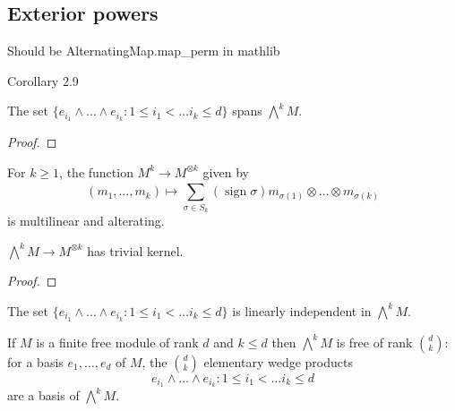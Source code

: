 
\subsection{Exterior powers}

\begin{theorem}
    \label{thm:exterior_power_univ_property}
\end{theorem}

\begin{lemma}
    \label{lem:alternating_multilinear_is_skew_symmetric}
    Should be AlternatingMap.map\_perm in mathlib
\end{lemma}

\begin{corollary}
    \label{cor:skew_symmetric_iff}
    Corollary 2.9
\end{corollary}

\begin{lemma}
    \label{lem:spans_exterior_power}
    The set $\{e_{i_1} \wedge \dots \wedge e_{i_k} : 1 \leq i_1 < \dots i_k \leq d\}$ spans $\bigwedge^k M$.
\end{lemma}

\begin{proof}
    
\end{proof}

\begin{lemma}
    \label{lem:multilinear_to_tensor_is_alternating}
    For $k \geq 1$, the function $M^k \to M^{\otimes k}$ given by 
    \[(m_1, \dots, m_k) \mapsto \sum_{\sigma \in S_k}^{} (\operatorname{sign} \sigma) m_{\sigma(1)} \otimes \dots \otimes m_{\sigma(k)} \]
    is multilinear and alterating.
\end{lemma}

\begin{lemma}
    \label{lem:hom_exterior_power_to_tensor_inj}
    $\bigwedge^k M \to M^{\otimes k}$ has trivial kernel.
\end{lemma}

\begin{proof}
    
\end{proof}

\begin{lemma}
    \label{lem:lin_indep_exterior_power}
    The set $\{e_{i_1} \wedge \dots \wedge e_{i_k} : 1 \leq i_1 < \dots i_k \leq d\}$ is linearly independent in $\bigwedge^k M$.
\end{lemma}

\begin{theorem}
    \label{thm:exterior_power_basis_if_finite_free_module}
    If $M$ is a finite free module of rank $d$ and $k \leq d$ then $\bigwedge^k M$ is free of rank $\binom{d}{k}$: for a basis $e_1, \dots, e_d$ of $M$, the $\binom{d}{k}$ elementary wedge products 
    \[
        e_{i_1} \wedge \dots \wedge e_{i_k} : 1 \leq i_1 < \dots i_k \leq d
    \]
    are a basis of $\bigwedge^k M$.
\end{theorem}